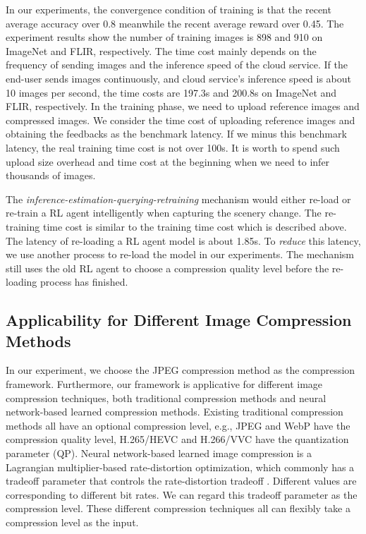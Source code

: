 \textcolor{revise}{In our experiments, the convergence condition of training is that the recent average accuracy over 0.8 meanwhile the recent average reward over 0.45. The experiment results show the number of training images is 898 and 910 on ImageNet and FLIR, respectively. The time cost mainly depends on the frequency of sending images and the inference speed of the cloud service. If the end-user sends images continuously, and cloud service's inference speed is about 10 images per second, the time costs are 197.3s and 200.8s on ImageNet and FLIR, respectively. In the training phase, we need to upload reference images and compressed images. We consider the time cost of uploading reference images and obtaining the feedbacks as the benchmark latency. If we minus this benchmark latency, the real training time cost is not over 100s. It is worth to spend such upload size overhead and time cost at the beginning when we need to infer thousands of images.}


\textcolor{revise}{The \emph{inference-estimation-querying-retraining} mechanism would either re-load or re-train a RL agent intelligently when capturing the scenery change. The re-training time cost is similar to the training time cost which is described above. The latency of re-loading a RL agent model is about 1.85s. To \emph{reduce} this latency, we use another process to re-load the model in our experiments. The mechanism still uses the old RL agent to choose a compression quality level before the re-loading process has finished.}

\subsection{Applicability for Different Image Compression Methods}

{\color{revise3} In our experiment, we choose the JPEG compression method as the compression framework. Furthermore, our framework is applicative for different image compression techniques, both traditional compression methods and neural network-based learned compression methods. Existing traditional compression methods all have an optional compression level, e.g., JPEG and WebP have the compression quality level, H.265/HEVC \cite{hevc} and H.266/VVC \cite{vvc} have the quantization parameter (QP). Neural network-based learned image compression is a Lagrangian multiplier-based rate-distortion optimization, which commonly has a tradeoff parameter that controls the rate-distortion tradeoff \cite{endtoend1,endtoend2,endtoend3,endtoend4}. Different values are corresponding to different bit rates. We can regard this tradeoff parameter as the compression level. These different compression techniques all can flexibly take a compression level as the input.}